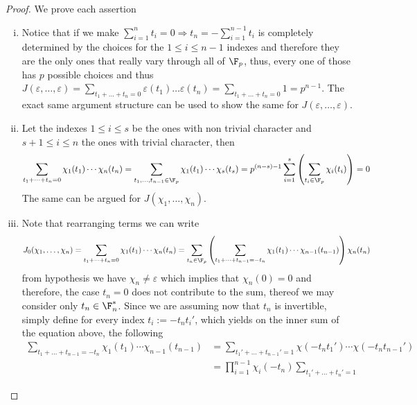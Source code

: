\begin{proof}
   We prove each assertion
   \begin{enumerate}[i.]
      \item Notice that if we make \( \sum_{i=1}^{n}t_i = 0 \Rightarrow t_n =
         -\sum_{i=1}^{n-1} t_i\) is completely determined by the choices for the
         \(1 \leqslant i \leqslant n-1\) indexes and therefore they are the only
         ones that really vary through all of \(\F_p\), thus, every one of those
         has \(p\) possible choices and thus \(J(\varepsilon, \dots, \varepsilon) =
         \sum_{t_1+\dots+t_n = 0} \varepsilon(t_1)\dots \varepsilon(t_n) =
         \sum_{t_1 + \dots + t_n = 0} 1 = p^{n-1}\). The exact same argument
         structure can be used to show the same for \(J(\varepsilon, \dots,
         \varepsilon)\).
      \item Let the indexes \(1 \leqslant i \leqslant s\) be the ones with non
         trivial character and \(s+1 \leqslant i \leqslant n\) the ones with
         trivial character, then
         \[
            \sum_{t_1+\dots+t_n=0} \chi_1(t_1) \cdots \chi_n(t_n)
            = \sum_{t_1,\dots,t_{n-1} \in \F_p} \chi_1(t_1) \cdots \chi_s(t_s)
            = p^{(n-s) - 1} \sum_{i=1}^{s} \left( \sum_{t_i \in \F_p}
            \chi_i(t_i) \right) = 0
         \] 
         The same can be argued for \(J(\chi_1, \dots, \chi_n)\).
      \item Note that rearranging terms we can write
         \[
            J_0(\chi_1, \dots, \chi_n) = \sum_{t_1+\dots+t_n=0} \chi_1(t_1)
            \cdots \chi_n(t_n) = \sum_{t_n \in \F_p} \left( \sum_{t_1 + \dots +
            t_{n-1} = -t_n} \chi_1(t_1)\cdots\chi_{n-1}(t_{n-1})\right)
            \chi_n(t_n)
         \] 
         from hypothesis we have \(\chi_n \neq \varepsilon\) which implies that
         \(\chi_n(0) = 0\) and therefore, the case \(t_n=0\) does not contribute
         to the sum, thereof  we may consider only \(t_n \in \F_n^\ast\). Since
         we are assuming now that \(t_n\) is invertible, simply define for every
         index \(t_i := -t_n t_i'\), which yields on the inner sum of the
         equation above, the following
         \begin{align*}
             \sum_{t_1 + \dots + t_{n-1} = -t_n}
             \chi_1(t_1)\cdots\chi_{n-1}(t_{n-1})
             &= \sum_{t_1' + \dots + t_{n-1}' = 1} \chi(-t_nt_1') \cdots
             \chi(-t_nt_{n-1}') \\
             &= \prod_{i = 1}^{n-1} \chi_i(-t_n) \sum_{t_1' + \dots + t_n' = 1}

\end{align*}
\end{enumerate}
\end{proof}
